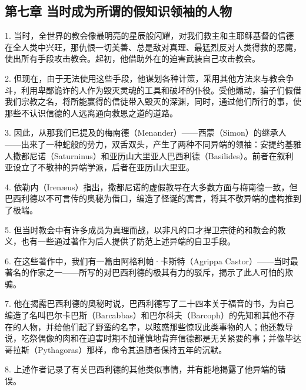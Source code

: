 
\subsection{第七章 当时成为所谓的假知识领袖的人物}

1. 当时，全世界的教会像最明亮的星辰般闪耀，对我们救主和主耶稣基督的信德在全人类中兴旺，那仇恨一切美善、总是敌对真理、最猛烈反对人类得救的恶魔，使出所有手段攻击教会。起初，他借助外在的迫害武装自己攻击教会。\par

2. 但现在，由于无法使用这些手段，他谋划各种计策，采用其他方法来与教会争斗，利用卑鄙诡诈的人作为毁灭灵魂的工具和破坏的仆役。受他煽动，骗子们假借我们宗教之名，将所能赢得的信徒带入毁灭的深渊，同时，通过他们所行的事，使那些不认识信德的人远离通向救恩之道的道路。\par

3. 因此，从那我们已提及的梅南德（Menander）——西蒙（Simon）的继承人——出来了一种蛇般的势力，双舌双头，产生了两种不同异端的领袖：安提约基雅人撒都尼诺（Saturninus）和亚历山大里亚人巴西利德（Basilides）。前者在叙利亚设立了不敬神的异端学派，后者在亚历山大里亚。\par

4. 依勒内（Irenæus）指出，撒都尼诺的虚假教导在大多数方面与梅南德一致，但巴西利德以不可言传的奥秘为借口，编造了怪诞的寓言，将其不敬异端的虚构推到了极端。\par

5. 但当时教会中有许多成员为真理而战，以非凡的口才捍卫宗徒的和教会的教义，也有一些通过著作为后人提供了防范上述异端的自卫手段。\par

6. 在这些著作中，我们有一篇由阿格利帕·卡斯特（Agrippa Castor）——当时最著名的作家之一——所写的对巴西利德的极其有力的驳斥，揭示了此人可怕的欺骗。\par

7. 他在揭露巴西利德的奥秘时说，巴西利德写了二十四本关于福音的书，为自己编造了名叫巴尔卡巴斯（Barcabbas）和巴尔科夫（Barcoph）的先知和其他不存在的人物，并给他们起了野蛮的名字，以眩惑那些惊叹此类事物的人；他还教导说，吃祭偶像的肉和在迫害时期不加谨慎地背弃信德都是无关紧要的事；并像毕达哥拉斯（Pythagoras）那样，命令其追随者保持五年的沉默。\par

8. 上述作者记录了有关巴西利德的其他类似事情，并有能地揭露了他异端的错误。\par


